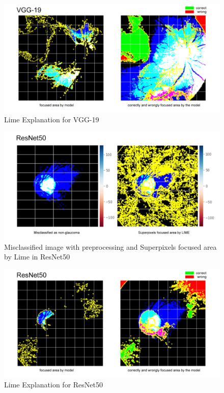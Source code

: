 \documentclass[conference]{IEEEtran}
\begin{document}
\begin{figure}[hbt!]
\centering
\includegraphics[scale=0.24]{fig-49.png}
\caption{Lime Explanation for VGG-19}
\label{fig:x Lime Explanation for VGG-19}
\end{figure}

\begin{figure}[hbt!]
\centering
\includegraphics[scale=0.24]{fig-50.png}
\caption{Misclassified image with preprocessing and Superpixels focused area by Lime in ResNet50}
\label{fig:x Misclassified image with preprocessing and Superpixels focused area by Lime in ResNet50}
\end{figure}

\begin{figure}[hbt!]
\centering
\includegraphics[scale=0.24]{fig-51.png}
\caption{Lime Explanation for ResNet50}
\label{fig:x Lime Explanation for ResNet50}
\end{figure}
\end{document}
